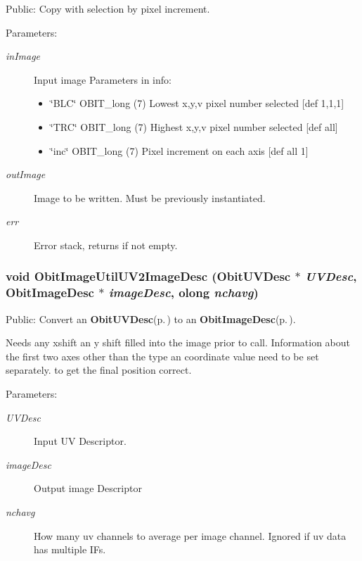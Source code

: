 Public: Copy with selection by pixel increment. 

\begin{Desc}
\item[Parameters:]
\begin{description}
\item[{\em in\-Image}]Input image Parameters in info: \begin{itemize}
\item \char`\"{}BLC\char`\"{} OBIT\_\-long (7) Lowest x,y,v pixel number selected [def 1,1,1] \item \char`\"{}TRC\char`\"{} OBIT\_\-long (7) Highest x,y,v pixel number selected [def all] \item \char`\"{}inc\char`\"{} OBIT\_\-long (7) Pixel increment on each axis [def all 1] \end{itemize}
\item[{\em out\-Image}]Image to be written. Must be previously instantiated. \item[{\em err}]Error stack, returns if not empty. \end{description}
\end{Desc}
\subsubsection{\setlength{\rightskip}{0pt plus 5cm}void Obit\-Image\-Util\-UV2Image\-Desc ({\bf Obit\-UVDesc} $\ast$ {\em UVDesc}, {\bf Obit\-Image\-Desc} $\ast$ {\em image\-Desc}, {\bf olong} {\em nchavg})}\label{ObitImageUtil_8h_a5}


Public: Convert an {\bf Obit\-UVDesc}{\rm (p.\,\pageref{structObitUVDesc})} to an {\bf Obit\-Image\-Desc}{\rm (p.\,\pageref{structObitImageDesc})}. 

Needs any xshift an y shift filled into the image prior to call. Information about the first two axes other than the type an coordinate value need to be set separately. to get the final position correct. \begin{Desc}
\item[Parameters:]
\begin{description}
\item[{\em UVDesc}]Input UV Descriptor. \item[{\em image\-Desc}]Output image Descriptor \item[{\em nchavg}]How many uv channels to average per image channel. Ignored if uv data has multiple IFs. \end{description}
\end{Desc}
